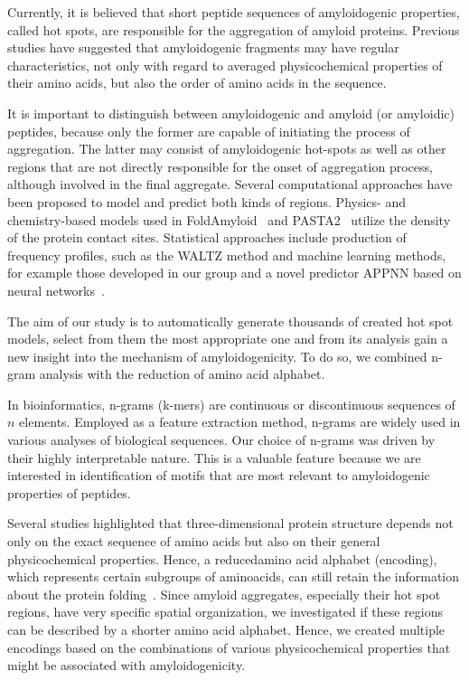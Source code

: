 \documentclass[fleqn,10pt,twoside]{gcb15submission}
\begin{document}
  Currently, it is believed that short peptide sequences of amyloidogenic 
properties, called hot spots, are responsible for the aggregation of amyloid 
proteins. Previous studies have suggested that amyloidogenic fragments may have 
regular characteristics, not only with regard to averaged physicochemical 
properties of their amino acids, but also the order of amino acids in the 
sequence. 

  It is important to distinguish between amyloidogenic and amyloid (or 
amyloidic) peptides, because only the former are capable of initiating the 
process of aggregation. The latter may consist of amyloidogenic hot-spots as 
well as other regions that are not directly responsible for the onset of 
aggregation process, although involved in the final aggregate. Several 
computational approaches have been proposed to model and predict both kinds of 
regions. Physics- and chemistry-based models used in  
FoldAmyloid~\citep{garbuzynskiy_foldamyloid:_2010} and 
PASTA2~\citep{walsh_pasta_2014} utilize the density of the protein contact 
sites. 
Statistical approaches include production of frequency profiles, such as the 
WALTZ method \citep{maurer-stroh_exploring_2010} and machine learning methods, 
for example those developed in our group \citep{gasior_fish_2014} and a novel 
predictor APPNN based on neural networks~\citep{familia_prediction_2015}. 
  
  The aim of our study is to automatically generate thousands of created hot 
spot models, select from them the most appropriate one and from its analysis 
gain a new insight into the mechanism of amyloidogenicity. To do so, we combined 
n-gram analysis with the reduction of amino acid alphabet.
  
  In bioinformatics, n-grams (k-mers) are continuous or discontinuous sequences 
of $n$ elements. Employed as a feature extraction method, n-grams are widely 
used in various analyses of biological sequences. Our choice of n-grams was driven by 
their highly interpretable nature. This is a valuable feature because we are 
interested in identification of motifs that are most relevant to amyloidogenic 
properties of peptides.

  Several studies highlighted that three-dimensional protein structure depends 
not only on the exact sequence of amino acids but also on their general 
physicochemical properties. Hence, a reducedamino acid alphabet (encoding), 
which represents certain subgroups of aminoacids, can still retain the 
information about the protein folding~\citep{murphy_simplified_2000}. Since 
amyloid aggregates, especially their hot spot regions, have very specific 
spatial organization, we investigated if these regions can be described by a 
shorter amino acid alphabet. Hence, we created multiple encodings based on the 
combinations of various physicochemical properties that might be associated with 
amyloidogenicity.  
\end{document}
